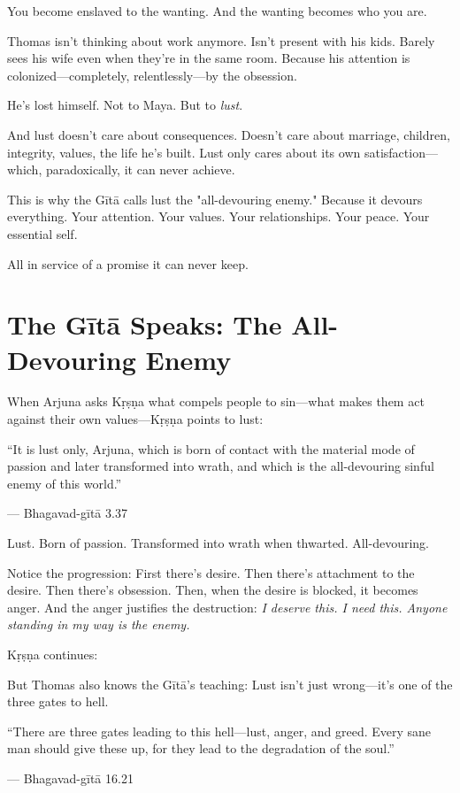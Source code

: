 \documentclass[11pt,twoside]{book}
\begin{document}
You become enslaved to the wanting. And the wanting becomes who you are.

Thomas isn't thinking about work anymore. Isn't present with his kids. Barely sees his wife even when they're in the same room. Because his attention is colonized—completely, relentlessly—by the obsession.

He's lost himself. Not to Maya. But to \emph{lust}.

And lust doesn't care about consequences. Doesn't care about marriage, children, integrity, values, the life he's built. Lust only cares about its own satisfaction—which, paradoxically, it can never achieve.

This is why the Gītā calls lust the "all-devouring enemy." Because it devours everything. Your attention. Your values. Your relationships. Your peace. Your essential self.

All in service of a promise it can never keep.

\section*{The Gītā Speaks: The All-Devouring Enemy}

When Arjuna asks Kṛṣṇa what compels people to sin—what makes them act against their own values—Kṛṣṇa points to lust:

\begin{pullquote}
``It is lust only, Arjuna, which is born of contact with the material mode of passion and later transformed into wrath, and which is the all-devouring sinful enemy of this world.''

--- Bhagavad-gītā 3.37
\end{pullquote}

Lust. Born of passion. Transformed into wrath when thwarted. All-devouring.

Notice the progression: First there's desire. Then there's attachment to the desire. Then there's obsession. Then, when the desire is blocked, it becomes anger. And the anger justifies the destruction: \emph{I deserve this. I need this. Anyone standing in my way is the enemy.}

Kṛṣṇa continues:

But Thomas also knows the Gītā's teaching: Lust isn't just wrong—it's one of the three gates to hell.

\begin{pullquote}
``There are three gates leading to this hell—lust, anger, and greed. Every sane man should give these up, for they lead to the degradation of the soul.''

--- Bhagavad-gītā 16.21
\end{pullquote}
\end{document}
